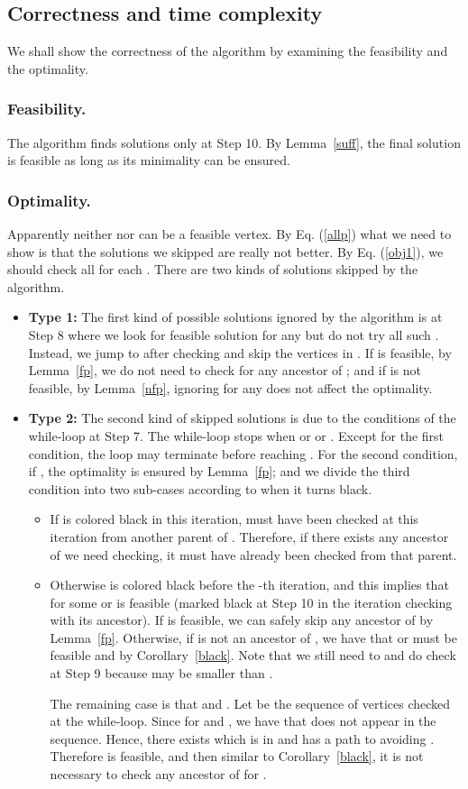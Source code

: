 \subsection{Correctness and time complexity}
We shall show the correctness of the algorithm by examining the feasibility and the optimality.
\subsubsection*{Feasibility.}
The algorithm finds solutions only at Step 10. By Lemma~\ref{suff}, the final solution is feasible as long as its minimality can be ensured. 

\subsubsection*{Optimality.}
Apparently neither  nor  can be a feasible vertex.
By Eq. (\ref{allp}) what we need to show is that the solutions we skipped are really not better.
By Eq. (\ref{obj1}), we should check all  for each .
There are two kinds of solutions skipped by the algorithm.
\begin{itemize}
\item {\bf Type 1:}
The first kind of possible solutions ignored by the algorithm is at Step 8 where we look for feasible solution  for any  but do not try all such . Instead, we jump to  after checking  and skip the vertices in .
If  is feasible, by Lemma~\ref{fp}, we do not need to check  for any ancestor  of ; and if 
 is not feasible, by Lemma~\ref{nfp}, ignoring  for any  does not affect the optimality.

\item {\bf Type 2:} The second kind of skipped solutions is due to the conditions of the while-loop at Step 7.
The while-loop stops when  or  or .
Except for the first condition, the loop may terminate before reaching .
For the second condition, if , the optimality is ensured by Lemma~\ref{fp}; and 
we divide the third condition  into two sub-cases according to when it turns black. 
\begin{itemize}
\item If  is colored black in this iteration,  must have been checked at this iteration from another parent of . Therefore, if there exists any ancestor of  we need checking, it must have already been checked from that parent. 
\item Otherwise  is colored black before the -th iteration, and this implies that  for some  or  is feasible (marked black at Step 10 in the iteration checking  with its ancestor). If  is feasible, we can safely skip any ancestor of  by Lemma~\ref{fp}. Otherwise, if  is not an ancestor of , we have that  or  must be feasible and  by Corollary~\ref{black}. Note that we still need to and do check  at Step 9 because  may be smaller than . 

The remaining case is that  and .
Let  be the sequence of vertices checked at the while-loop.
Since  for  and , we have that  does not appear in the sequence. Hence, there exists  which is in  and has a path to  avoiding .
Therefore  is feasible, 
and then similar to Corollary~\ref{black}, it is not necessary to check any ancestor of  for .  
\end{itemize}
\end{itemize}
